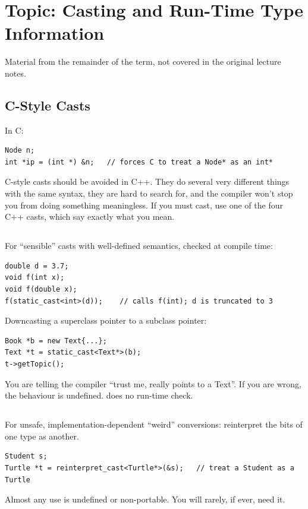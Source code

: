 \chapter{Topic: Casting and Run-Time Type Information}

\begin{aside}
Material from the remainder of the term, not covered in the original lecture
notes.
\end{aside}

\section{C-Style Casts}
In C:
\begin{lstlisting}[style=c]
Node n;
int *ip = (int *) &n;   // forces C to treat a Node* as an int*
\end{lstlisting}
C-style casts should be avoided in C++. They do several very different things
with the same syntax, they are hard to search for, and the compiler won't stop
you from doing something meaningless. If you must cast, use one of the four C++
casts, which say exactly what you mean.

\section{}
For ``sensible'' casts with well-defined semantics, checked at compile time:
\begin{lstlisting}[style=cpp]
double d = 3.7;
void f(int x);
void f(double x);
f(static_cast<int>(d));    // calls f(int); d is truncated to 3
\end{lstlisting}
Downcasting a superclass pointer to a subclass pointer:
\begin{lstlisting}[style=cpp]
Book *b = new Text{...};
Text *t = static_cast<Text*>(b);
t->getTopic();
\end{lstlisting}
You are telling the compiler ``trust me,  really points to a Text''. If
you are wrong, the behaviour is undefined.  does no run-time
check.

\section{}
For unsafe, implementation-dependent ``weird'' conversions: reinterpret the bits
of one type as another.
\begin{lstlisting}[style=cpp]
Student s;
Turtle *t = reinterpret_cast<Turtle*>(&s);   // treat a Student as a Turtle
\end{lstlisting}
Almost any use is undefined or non-portable. You will rarely, if ever, need it.

